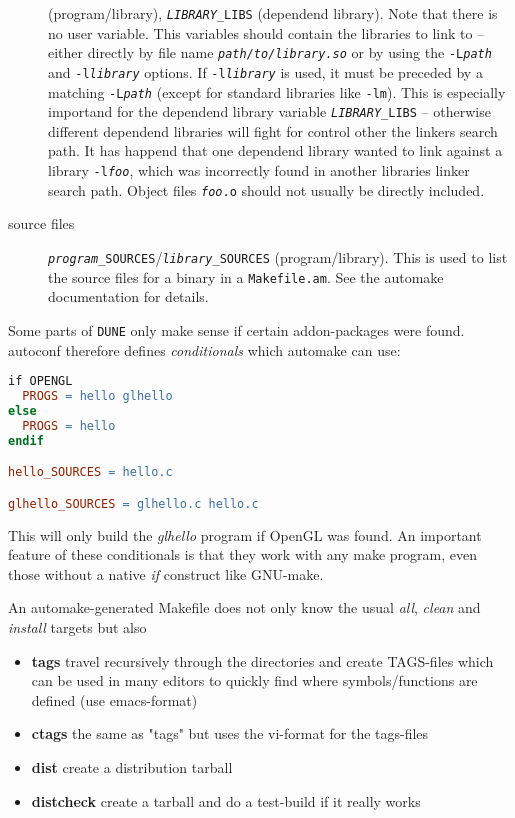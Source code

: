 \documentclass[11pt,a4paper,headinclude,footinclude,DIV16,normalheadings]{scrartcl}
\newcommand{\dune}{\texttt{DUNE}\xspace}
\begin{document}
\begin{description}
  (program/library), \texttt{\textit{LIBRARY}\_LIBS} (dependend library).
  Note that there is no user variable.  This variables should contain the
  libraries to link to -- either directly by file name
  \texttt{\textit{path/to/library.so}} or by using the
  \texttt{-L\textit{path}} and \texttt{-l\textit{library}} options.  If
  \texttt{-l\textit{library}} is used, it must be preceded by a matching
  \texttt{-L\textit{path}} (except for standard libraries like \texttt{-lm}).
  This is especially importand for the dependend library variable
  \texttt{\textit{LIBRARY}\_LIBS} -- otherwise different dependend libraries
  will fight for control other the linkers search path.  It has happend that
  one dependend library wanted to link against a library
  \texttt{-l\textit{foo}}, which was incorrectly found in another libraries
  linker search path.  Object files \texttt{\textit{foo}.o} should not usually
  be directly included.
\item[source files]
  \texttt{\textit{program}\_SOURCES}/\texttt{\textit{library}\_SOURCES}
  (program/library).  This is used to list the source files for a binary in a
  \texttt{Makefile.am}.  See the automake documentation for details.
\end{description}


Some parts of \dune only make sense if certain addon-packages were
found. autoconf therefore defines {\em conditionals} which automake can
use:

\begin{lstlisting}[language=make]
if OPENGL
  PROGS = hello glhello
else
  PROGS = hello
endif

hello_SOURCES = hello.c

glhello_SOURCES = glhello.c hello.c
\end{lstlisting}

This will only build the {\em glhello} program if OpenGL was found. An
important feature of these conditionals is that they work with any
make program, even those without a native {\em if} construct like GNU-make.


An automake-generated Makefile does not only know the usual {\em all},
{\em clean} and {\em install} targets but also
\begin{itemize}
\item {\bf tags} travel recursively through the directories and create
  TAGS-files which can be used in many editors to quickly find where
  symbols/functions are defined (use emacs-format)
\item {\bf ctags} the same as "tags" but uses the vi-format for the tags-files
\item {\bf dist} create a distribution tarball
\item {\bf distcheck} create a tarball and do a test-build if it really works
\end{itemize}
\end{document}
